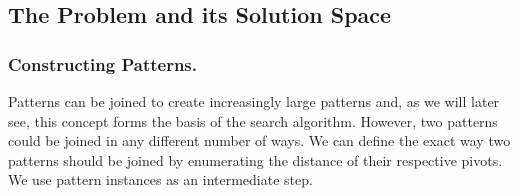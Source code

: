 \documentclass{llncs}
\begin{document}
\begin{comment}
In the example we can see that $G(X)= \tiny\begin{bmatrix}1 & 1 \\[-.2em]\cdot & 1 \\[-.2em]1 & 1\end{bmatrix}$ and that $M(X)=1\ 2\ 1\ 1\ 2$. In fact, because all four patterns have the same geometry, we say that they are \textbf{isomorphic}. As such we write $X \cong Y$ iff $G(X) = G(Y)$. 

To understand the importance of separating the structure and magnitude of patterns, let us briefly expand the example above. Suppose we have a large matrix $B$ that consists of $n$ clusters of matrices $W$ and $X$ from Figure \ref{example3}. To determine the optimal description of $B$, we might want to look at the prevalence of each submatrix. Say it contains $\frac{n}{2}$ $W$'s and $\frac{n}{2}$ $X$'s. In this case it makes sense to include both patterns in the description. However, we could also exploit the fact that the structure of both patterns is equivalent and make the description more concise by only storing $G(W)$ and then $M(W)$ and $M(X)$ separately. Now imagine that $B$ only contains one $W$ and $n-1$ $X$'s. In this case the one $W$ might be an anomaly that we would like to detect. However, it could also be due to noise in the data in which case we would like to describe $B$ just using $n$ $X$'s. It is impossible to make this distinction beforehand. 

One possibility for solving this problem is to let the MDL equation decide whether the stray $W$ is an anomaly or not. Recall that according to the MDL principle the most succinct description is the best. Therefore if the amount of `effort' required to transform $X$ into $W$ is small, we should probably encode that one $W$ using $X$. In that case it is considered noise, while it is probably an anomaly if doing so would yield a larger description.
\end{comment}


\subsection{The Problem and its Solution Space}

\subsubsection{Constructing Patterns.}
\label{constructpatterns}
Patterns can be joined to create increasingly large patterns and, as we will later see, this concept forms the basis of the search algorithm. However, two patterns could be joined in any different number of ways. We can define the exact way two patterns should be joined by enumerating the distance of their respective pivots. We use pattern instances as an intermediate step.
\end{document}
